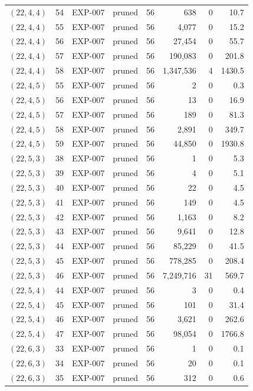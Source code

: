 \begin{longtable}{lrllrrrr}
$(22,4,4)$ & 54 & EXP-007 & pruned & 56 & 638 & 0 & 10.7 \\
$(22,4,4)$ & 55 & EXP-007 & pruned & 56 & 4{,}077 & 0 & 15.2 \\
$(22,4,4)$ & 56 & EXP-007 & pruned & 56 & 27{,}454 & 0 & 55.7 \\
$(22,4,4)$ & 57 & EXP-007 & pruned & 56 & 190{,}083 & 0 & 201.8 \\
$(22,4,4)$ & 58 & EXP-007 & pruned & 56 & 1{,}347{,}536 & 4 & 1430.5 \\
$(22,4,5)$ & 55 & EXP-007 & pruned & 56 & 2 & 0 & 0.3 \\
$(22,4,5)$ & 56 & EXP-007 & pruned & 56 & 13 & 0 & 16.9 \\
$(22,4,5)$ & 57 & EXP-007 & pruned & 56 & 189 & 0 & 81.3 \\
$(22,4,5)$ & 58 & EXP-007 & pruned & 56 & 2{,}891 & 0 & 349.7 \\
$(22,4,5)$ & 59 & EXP-007 & pruned & 56 & 44{,}850 & 0 & 1930.8 \\
$(22,5,3)$ & 38 & EXP-007 & pruned & 56 & 1 & 0 & 5.3 \\
$(22,5,3)$ & 39 & EXP-007 & pruned & 56 & 4 & 0 & 5.1 \\
$(22,5,3)$ & 40 & EXP-007 & pruned & 56 & 22 & 0 & 4.5 \\
$(22,5,3)$ & 41 & EXP-007 & pruned & 56 & 149 & 0 & 4.5 \\
$(22,5,3)$ & 42 & EXP-007 & pruned & 56 & 1{,}163 & 0 & 8.2 \\
$(22,5,3)$ & 43 & EXP-007 & pruned & 56 & 9{,}641 & 0 & 12.8 \\
$(22,5,3)$ & 44 & EXP-007 & pruned & 56 & 85{,}229 & 0 & 41.5 \\
$(22,5,3)$ & 45 & EXP-007 & pruned & 56 & 778{,}285 & 0 & 208.4 \\
$(22,5,3)$ & 46 & EXP-007 & pruned & 56 & 7{,}249{,}716 & 31 & 569.7 \\
$(22,5,4)$ & 44 & EXP-007 & pruned & 56 & 3 & 0 & 0.4 \\
$(22,5,4)$ & 45 & EXP-007 & pruned & 56 & 101 & 0 & 31.4 \\
$(22,5,4)$ & 46 & EXP-007 & pruned & 56 & 3{,}621 & 0 & 262.6 \\
$(22,5,4)$ & 47 & EXP-007 & pruned & 56 & 98{,}054 & 0 & 1766.8 \\
$(22,6,3)$ & 33 & EXP-007 & pruned & 56 & 1 & 0 & 0.1 \\
$(22,6,3)$ & 34 & EXP-007 & pruned & 56 & 20 & 0 & 0.1 \\
$(22,6,3)$ & 35 & EXP-007 & pruned & 56 & 312 & 0 & 0.6 \\

\end{longtable}
